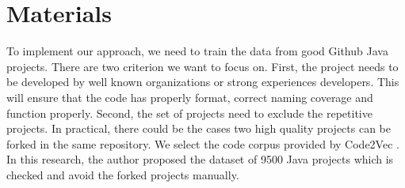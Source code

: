 \section{Materials}
To implement our approach, we need to train the data from good Github Java projects. There are two criterion we want to focus on. First, the project needs to be developed by well known organizations or strong experiences developers. This will ensure that the code has properly format, correct naming coverage and function properly. Second, the set of projects need to exclude the repetitive projects. In practical, there could be the cases two high quality projects can be forked in the same repository. We select the code corpus provided by Code2Vec \cite{013}. In this research, the author proposed the dataset of 9500 Java projects which is checked and avoid the forked projects manually.